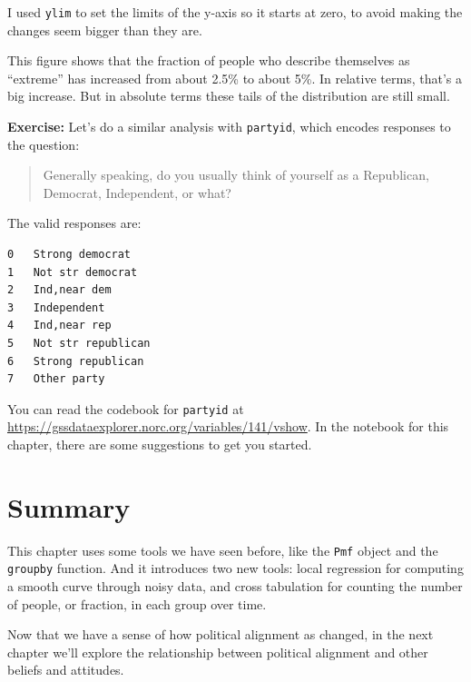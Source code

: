 I used \passthrough{\lstinline!ylim!} to set the limits of the y-axis so
it starts at zero, to avoid making the changes seem bigger than they
are.

This figure shows that the fraction of people who describe themselves as
``extreme'' has increased from about 2.5\% to about 5\%. In relative
terms, that's a big increase. But in absolute terms these tails of the
distribution are still small.

\textbf{Exercise:} Let's do a similar analysis with
\passthrough{\lstinline!partyid!}, which encodes responses to the
question:

\begin{quote}
Generally speaking, do you usually think of yourself as a Republican,
Democrat, Independent, or what?
\end{quote}

The valid responses are:

\begin{lstlisting}
0   Strong democrat
1   Not str democrat
2   Ind,near dem
3   Independent
4   Ind,near rep
5   Not str republican
6   Strong republican
7   Other party
\end{lstlisting}

You can read the codebook for \passthrough{\lstinline!partyid!} at
\url{https://gssdataexplorer.norc.org/variables/141/vshow}. In the
notebook for this chapter, there are some suggestions to get you
started.

\hypertarget{summary}{%
\section{Summary}\label{summary}}

This chapter uses some tools we have seen before, like the
\passthrough{\lstinline!Pmf!} object and the
\passthrough{\lstinline!groupby!} function. And it introduces two new
tools: local regression for computing a smooth curve through noisy data,
and cross tabulation for counting the number of people, or fraction, in
each group over time.

Now that we have a sense of how political alignment as changed, in the
next chapter we'll explore the relationship between political alignment
and other beliefs and attitudes.


